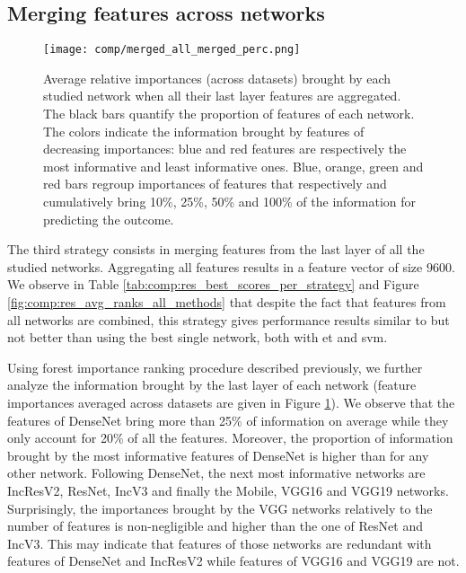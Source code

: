 \subsection{Merging features across networks}
\label{ssec:comp:exp_merge_net}


 \begin{figure}
     \center 
     \texttt{[image: comp/merged\_all\_merged\_perc.png]}
     \caption{Average relative importances (across datasets) brought by each studied network when all their last layer features are aggregated. The black bars quantify the proportion of features of each network. The colors indicate the information brought by features of decreasing importances: blue and red features are respectively the most informative and least informative ones. Blue, orange, green and red bars regroup importances of features that respectively and cumulatively bring 10\%, 25\%, 50\% and 100\% of the information for predicting the outcome.}
     \label{fig:comp:models_merged_avg_imp}
 \end{figure}


The third strategy consists in merging features from the last layer of all the studied networks. Aggregating all features results in a feature vector of size $9600.$ We observe in Table \ref{tab:comp:res_best_scores_per_strategy} and Figure \ref{fig:comp:res_avg_ranks_all_methods} that despite the fact that features from all networks are combined, this strategy gives performance results similar to but not better than using the best single network, both with \acrshort{et} and \acrshort{svm}.

Using forest importance ranking procedure described previously, we further analyze the information brought by the last layer of each network (feature importances averaged across datasets are given in Figure \ref{fig:comp:models_merged_avg_imp}). We observe that the features of DenseNet bring more than 25\% of information on average while they only account for 20\% of all the features. Moreover, the proportion of information brought by the most informative features of DenseNet is higher than for any other network. Following DenseNet, the next most informative networks are IncResV2, ResNet, IncV3 and finally the Mobile, VGG16 and VGG19 networks. 
Surprisingly, the importances brought by the VGG networks relatively to the number of features is non-negligible and higher than the one of ResNet and IncV3. This may indicate that features of those networks are redundant with features of DenseNet and IncResV2 while features of VGG16 and VGG19 are not.



